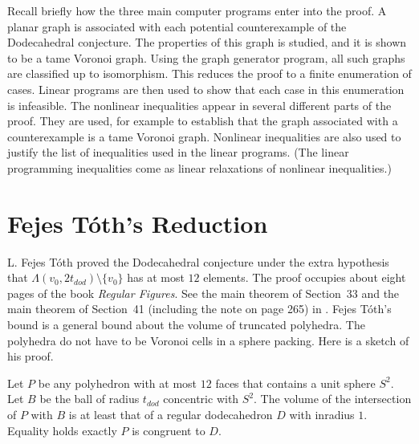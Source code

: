 Recall briefly how the three main computer programs
enter into the proof.  A planar graph is associated with
each potential counterexample of the Dodecahedral conjecture.
The properties of this graph is studied, and it is shown to
be a tame Voronoi graph.  Using the graph generator program,
all such graphs are classified up to isomorphism.  This
reduces the proof to a finite enumeration of cases. Linear programs
are then used to show that each case in this enumeration is 
infeasible.  The nonlinear inequalities appear in several different
parts of the proof.
They are used, for example to establish that the graph associated
with a counterexample is a tame Voronoi graph.  Nonlinear
inequalities are also used to justify the list of inequalities
used in the linear programs. (The linear programming inequalities
come as linear relaxations of nonlinear inequalities.)



\section{Fejes T\'oth's Reduction}\label{sec:12sphere}

L. Fejes T\'oth proved  the Dodecahedral conjecture 
under the extra hypothesis that $\Lambda(v_0,2t_{dod})\setminus\{v_0\}$
has at most $12$  elements.  The proof occupies about
eight pages of the book {\it Regular Figures}.  See the main
theorem of
Section~33 and the main theorem of Section~41 (including
the note on page 265) in \cite{Toth2}.  Fejes T\'oth's
bound is a general bound about the volume of truncated polyhedra.
The polyhedra do not have to be Voronoi cells in a sphere packing.
Here is a sketch of his proof.

\begin{theorem}  Let $P$ be any polyhedron with at most $12$ faces
that contains a unit sphere $S^2$.  Let $B$ be the ball of
radius $t_{dod}$ concentric with $S^2$.  The volume of the intersection
of $P$ with $B$ is
at least that of a regular
dodecahedron $D$ with inradius $1$.
Equality holds exactly $P$ is congruent to $D$.
\end{theorem}

